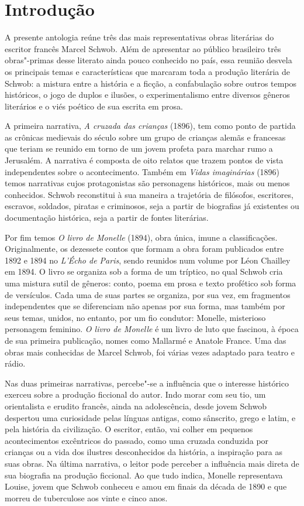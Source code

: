 \chapter{Introdução}

A presente antologia reúne três das mais representativas obras literárias do escritor francês Marcel Schwob.
Além de apresentar ao público brasileiro três obras"-primas desse literato ainda pouco conhecido no país, essa reunião desvela os principais temas e características que marcaram toda a produção literária de Schwob: a mistura entre a história e a ficção, a confabulação sobre outros tempos históricos, o jogo de duplos e ilusões, o experimentalismo entre diversos gêneros literários e o viés poético de sua escrita em prosa.

A primeira narrativa, \textit{A cruzada das crianças} (1896), tem como ponto de partida as crônicas medievais do século  
sobre um grupo de crianças alemãs e francesas que teriam se reunido em torno de um jovem profeta para
marchar rumo a Jerusalém. A narrativa é composta de oito relatos que trazem
pontos de vista independentes sobre o acontecimento.
Também em \textit{Vidas imaginárias} (1896) temos narrativas cujos protagonistas são personagens históricos,
mais ou menos conhecidos. Schwob reconstitui à sua maneira a trajetória de
filósofos, escritores, escravos, soldados, piratas e criminosos, seja a partir
de biografias já existentes ou documentação histórica, seja a
partir de fontes literárias.

Por fim temos \textit{O livro de Monelle} (1894), obra única, imune a classificações. Originalmente, os dezessete 
contos que formam a obra foram publicados entre 1892 e 1894 no \textit{L'Écho de Paris}, sendo reunidos num volume 
por Léon Chailley em 1894. O livro se organiza sob a forma de um tríptico, no qual Schwob cria uma mistura sutil de
gêneros: conto, poema em prosa e texto profético sob forma de versículos. Cada
uma de suas partes se organiza, por sua vez, em fragmentos independentes que se
diferenciam não apenas por sua forma, mas também por seus temas, unidos, no
entanto, por um fio condutor: Monelle, misterioso personagem feminino. \textit{O livro
de Monelle} é um livro de luto que fascinou, à época de sua
primeira publicação, nomes como Mallarmé e Anatole France. Uma das obras mais
conhecidas de Marcel Schwob, foi várias vezes adaptado para
teatro e rádio.

Nas duas primeiras narrativas, percebe"-se a influência que o interesse histórico exerceu sobre a produção ficcional do autor. Indo morar com seu tio, um orientalista e erudito francês, ainda na adolescência, desde jovem Schwob despertou uma curiosidade pelas línguas antigas, como sânscrito, grego e latim, e pela história da civilização.
O escritor, então, vai colher em pequenos acontecimentos excêntricos do passado, como uma cruzada conduzida por crianças ou a vida dos ilustres desconhecidos da história, a inspiração para as suas obras. Na última narrativa, o leitor pode perceber a influência mais direta de sua biografia na produção ficcional. Ao que tudo indica, Monelle representava Louise, jovem que Schwob conheceu e amou em finais da década de 1890 e que morreu de tuberculose aos vinte e cinco anos.

